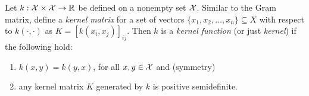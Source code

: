 Let \(k : \mathcal{X} \times \mathcal{X} \to \mathbb{R}\) be defined on a nonempty set \(\mathcal{X}\).
Similar to the Gram matrix, define a \textit{kernel matrix} for a set of vectors \(\{x_1, x_2, \dots, x_n\} \subseteq X\) with respect to \(k(\cdot, \cdot)\) as \(K = [k(x_i,x_j)]_{ij}\).
Then \(k\) is a \textit{kernel function} (or just \textit{kernel}) if the following hold:
\begin{enumerate}
    \item \(k(x,y) = k(y,x)\), for all \(x,y \in \mathcal{X}\) and
    \hfill (symmetry)
    \item any kernel matrix \(K\) generated by \(k\) is positive semidefinite.
\end{enumerate}